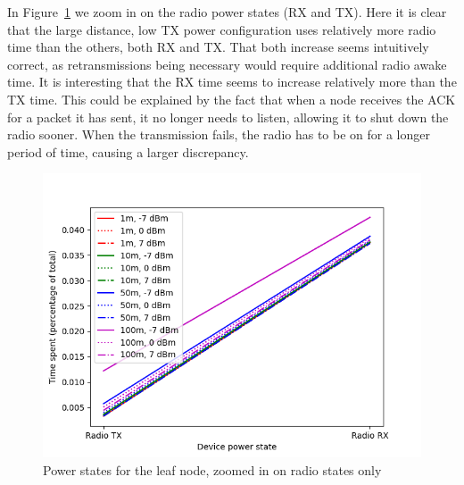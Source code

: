 \documentclass[conference]{IEEEtran}
\newcommand{\figref}[1]{Figure~\ref{#1}}
\renewcommand\_{\textunderscore\allowbreak}
\begin{document}
In \figref{fig:leaf_radiostates} we zoom in on the radio power states (RX and TX). Here it is clear that the large distance, low TX power configuration uses relatively more radio time than the others, both RX and TX. That both increase seems intuitively correct, as retransmissions being necessary would require additional radio awake time. It is interesting that the RX time seems to increase relatively more than the TX time. This could be explained by the fact that when a node receives the ACK for a packet it has sent, it no longer needs to listen, allowing it to shut down the radio sooner. When the transmission fails, the radio has to be on for a longer period of time, causing a larger discrepancy. 

\begin{figure}[htbp]
	\centering
	\includegraphics[width=.48\textwidth,keepaspectratio]{figures/leaf_rx_tx}
	\caption{Power states for the leaf node, zoomed in on radio states only}
	\label{fig:leaf_radiostates}
\end{figure}
\end{document}

